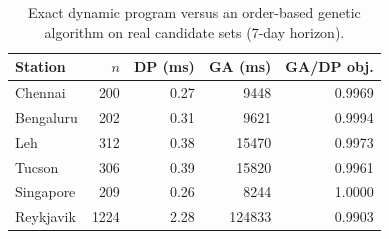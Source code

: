 \begin{table}[t]
\caption{Exact dynamic program versus an order-based genetic algorithm on real candidate sets (7-day horizon).}
\label{tab:genetic}
\centering
\begin{tabular}{lrrrr}
\toprule
Station & $n$ & DP (ms) & GA (ms) & GA/DP obj. \\
\midrule
Chennai & 200 & 0.27 & 9448 & 0.9969 \\
Bengaluru & 202 & 0.31 & 9621 & 0.9994 \\
Leh & 312 & 0.38 & 15470 & 0.9973 \\
Tucson & 306 & 0.39 & 15820 & 0.9961 \\
Singapore & 209 & 0.26 & 8244 & 1.0000 \\
Reykjavik & 1224 & 2.28 & 124833 & 0.9903 \\
\bottomrule
\end{tabular}
\end{table}
